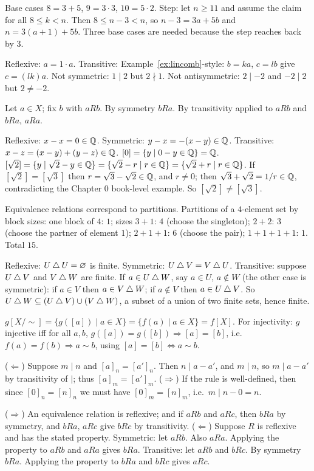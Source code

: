  Base cases $8=3+5$, $9=3\cdot3$, $10=5\cdot2$. Step: let $n\ge11$ and assume the claim for all $8\le k<n$. Then $8\le n-3<n$, so $n-3=3a+5b$ and $n=3(a+1)+5b$. Three base cases are needed because the step reaches back by $3$.

 Reflexive: $a=1\cdot a$. Transitive: Example~\ref{ex:lincomb}-style: $b=ka$, $c=lb$ give $c=(lk)a$. Not symmetric: $1\mid2$ but $2\nmid1$. Not antisymmetric: $2\mid-2$ and $-2\mid2$ but $2\ne-2$.

 Let $a\in X$; fix $b$ with $aRb$. By symmetry $bRa$. By transitivity applied to $aRb$ and $bRa$, $aRa$.

 Reflexive: $x-x=0\in\mathbb{Q}$. Symmetric: $y-x=-(x-y)\in\mathbb{Q}$. Transitive: $x-z=(x-y)+(y-z)\in\mathbb{Q}$. $[0]=\{y\mid 0-y\in\mathbb{Q}\}=\mathbb{Q}$. $[\sqrt2]=\{y\mid\sqrt2-y\in\mathbb{Q}\}=\{\sqrt2-r\mid r\in\mathbb{Q}\}=\{\sqrt2+r\mid r\in\mathbb{Q}\}$. If $[\sqrt2]=[\sqrt3]$ then $r=\sqrt3-\sqrt2\in\mathbb{Q}$, and $r\ne0$; then $\sqrt3+\sqrt2=1/r\in\mathbb{Q}$, contradicting the Chapter 0 book-level example. So $[\sqrt2]\ne[\sqrt3]$.

 Equivalence relations correspond to partitions. Partitions of a $4$-element set by block sizes: one block of $4$: $1$; sizes $3+1$: $4$ (choose the singleton); $2+2$: $3$ (choose the partner of element $1$); $2+1+1$: $6$ (choose the pair); $1+1+1+1$: $1$. Total $15$.

 Reflexive: $U\mathbin{\triangle} U=\varnothing$ is finite. Symmetric: $U\mathbin{\triangle} V=V\mathbin{\triangle} U$. Transitive: suppose $U\mathbin{\triangle} V$ and $V\mathbin{\triangle} W$ are finite. If $a\in U\mathbin{\triangle} W$, say $a\in U$, $a\notin W$ (the other case is symmetric): if $a\in V$ then $a\in V\mathbin{\triangle} W$; if $a\notin V$ then $a\in U\mathbin{\triangle} V$. So $U\mathbin{\triangle} W\subseteq(U\mathbin{\triangle} V)\cup(V\mathbin{\triangle} W)$, a subset of a union of two finite sets, hence finite.

 $g[X/{\sim}]=\{g([a])\mid a\in X\}=\{f(a)\mid a\in X\}=f[X]$. For injectivity: $g$ injective iff for all $a,b$, $g([a])=g([b])\Rightarrow[a]=[b]$, i.e.\ $f(a)=f(b)\Rightarrow a\sim b$, using $[a]=[b]\Leftrightarrow a\sim b$.

 ($\Leftarrow$) Suppose $m\mid n$ and $[a]_n=[a']_n$. Then $n\mid a-a'$, and $m\mid n$, so $m\mid a-a'$ by transitivity of $\mid$; thus $[a]_m=[a']_m$. ($\Rightarrow$) If the rule is well-defined, then since $[0]_n=[n]_n$ we must have $[0]_m=[n]_m$, i.e.\ $m\mid n-0=n$.

 ($\Rightarrow$) An equivalence relation is reflexive; and if $aRb$ and $aRc$, then $bRa$ by symmetry, and $bRa$, $aRc$ give $bRc$ by transitivity. ($\Leftarrow$) Suppose $R$ is reflexive and has the stated property. Symmetric: let $aRb$. Also $aRa$. Applying the property to $aRb$ and $aRa$ gives $bRa$. Transitive: let $aRb$ and $bRc$. By symmetry $bRa$. Applying the property to $bRa$ and $bRc$ gives $aRc$.

